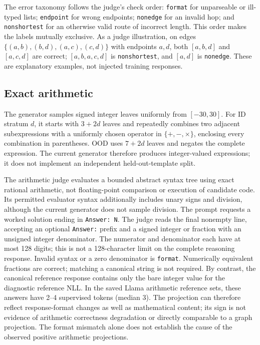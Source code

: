 The error taxonomy follows the judge's check order: \texttt{format} for
unparseable or ill-typed lists; \texttt{endpoint} for wrong endpoints;
\texttt{nonedge} for an invalid hop; and \texttt{nonshortest} for an otherwise
valid route of incorrect length. This order makes the labels mutually
exclusive. As a judge illustration, on edges
$\{(a,b),(b,d),(a,c),(c,d)\}$ with endpoints $a,d$, both $[a,b,d]$ and
$[a,c,d]$ are correct; $[a,b,a,c,d]$ is \texttt{nonshortest}, and $[a,d]$
is \texttt{nonedge}. These are explanatory examples, not injected training
responses.

\subsection{Exact arithmetic}
The generator samples signed integer leaves uniformly from $[-30,30]$.
For ID stratum $d$, it starts with $3+2d$ leaves and repeatedly combines
two adjacent subexpressions with a uniformly chosen operator in
$\{+,-,\times\}$, enclosing every combination in parentheses. OOD uses
$7+2d$ leaves and negates the complete expression. The current generator
therefore produces integer-valued expressions; it does not implement an
independent held-out-template split.

The arithmetic judge evaluates a bounded abstract syntax tree using
exact rational arithmetic, not floating-point comparison or execution of
candidate code. Its permitted evaluator syntax additionally includes unary
signs and division, although the current generator does not sample division.
The prompt requests a worked solution ending in \texttt{Answer: N}.
The judge reads the final nonempty line, accepting an optional
\texttt{Answer:} prefix and a signed integer or fraction with an unsigned
integer denominator. The numerator and denominator each have at most 128
digits; this is not a 128-character limit on the complete reasoning response.
Invalid syntax or a zero denominator is \texttt{format}. Numerically
equivalent fractions are correct; matching a canonical string is not required.
By contrast, the canonical reference response contains only the bare integer value
for the diagnostic reference NLL. In the saved Llama arithmetic reference
sets, these answers have 2--4 supervised tokens (median 3). The projection
can therefore reflect response-format changes as well as mathematical
content; its sign is not evidence of arithmetic correctness degradation or
directly comparable to a graph projection. The format mismatch alone does
not establish the cause of the observed positive arithmetic projections.


